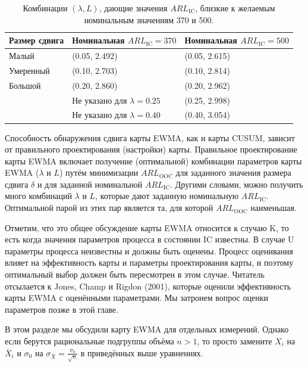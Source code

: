 \begin{table}[htbp]
	\centering
	\caption{Комбинации \((\lambda, L)\), дающие значения \(ARL_{\text{IC}}\), близкие к желаемым номинальным значениям 370 и 500.}
	\label{tab:3.2}
	\renewcommand{\arraystretch}{1.1} %
	\begin{tabular}{lll}
		\toprule
		Размер сдвига & Номинальная \(ARL_{\text{IC}} = 370\) & Номинальная \(ARL_{\text{IC}} = 500\) \\
		\midrule
		Малый    & (0.05, 2.492) & (0.05, 2.615) \\
		Умеренный & (0.10, 2.703) & (0.10, 2.814) \\
		Большой    & (0.20, 2.860) & (0.20, 2.962) \\
		&  Не указано для \(\lambda = 0.25\) & (0.25, 2.998) \\
		& Не указано для \(\lambda = 0.40\) & (0.40, 3.054) \\
		\bottomrule
	\end{tabular}
\end{table}	

Способность обнаружения сдвига карты EWMA, как и карты CUSUM, зависит от правильного проектирования (настройки) карты. Правильное проектирование карты EWMA включает получение (оптимальной) комбинации параметров карты EWMA (\(\lambda\) и \(L\)) путём минимизации \(ARL_{\text{OOC}}\) для заданного значения размера сдвига \(\delta\) и для заданной номинальной \(ARL_{\text{IC}}\). Другими словами, можно получить много комбинаций \(\lambda\) и \(L\), которые дают заданную номинальную \(ARL_{\text{IC}}\). Оптимальной парой из этих пар является та, для которой \(ARL_{\text{OOC}}\) наименьшая.

Отметим, что это общее обсуждение карты EWMA относится к случаю K, то есть когда значения параметров процесса в состоянии IC известны. В случае U параметры процесса неизвестны и должны быть оценены. Процесс оценивания влияет на эффективность карты и параметры проектирования карты, и поэтому оптимальный выбор должен быть пересмотрен в этом случае. Читатель отсылается к Jones, Champ и Rigdon (2001), которые оценили эффективность карты EWMA с оценёнными параметрами. Мы затронем вопрос оценки параметров позже в этой главе.

В этом разделе мы обсудили карту EWMA для отдельных измерений. Однако если берутся рациональные подгруппы объёма \(n > 1\), то просто замените \(X_i\) на \(\overline{X}_i\) и \(\sigma_0\) на \(\sigma_{\overline{X}} = \frac{\sigma_0}{\sqrt{n}}\) в приведённых выше уравнениях.

